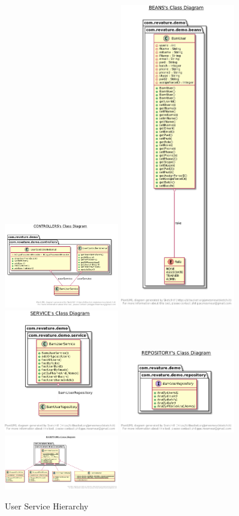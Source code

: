 \begin{figure}[htp]
\centering
\includegraphics[width=5cm]{images/Usercontrollers}
\includegraphics[width=5cm]{images/Userbeans}
\includegraphics[width=5cm]{images/Userservice}
\includegraphics[width=5cm]{images/Userrepository}
\includegraphics[width=5cm]{images/Userexception}
\caption{User Service Hierarchy}
\label{fig:lion}
\end{figure}
